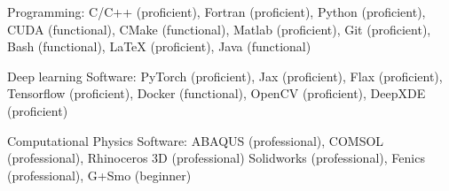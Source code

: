 {\color{black}
\begin{cvitems}


  \item {Programming: C/C++ (proficient), Fortran (proficient), Python (proficient), CUDA (functional), CMake (functional), Matlab (proficient), Git (proficient), Bash (functional), LaTeX (proficient), Java (functional)}
  
  

  \item {Deep learning Software: PyTorch (proficient), Jax (proficient), Flax (proficient), Tensorflow (proficient), Docker (functional), OpenCV (proficient), DeepXDE (proficient)}

  \item {Computational Physics Software: ABAQUS (professional), COMSOL (professional), Rhinoceros 3D (professional) Solidworks (professional), Fenics (professional), G+Smo (beginner)}  
  
  
  \end{cvitems}
  }